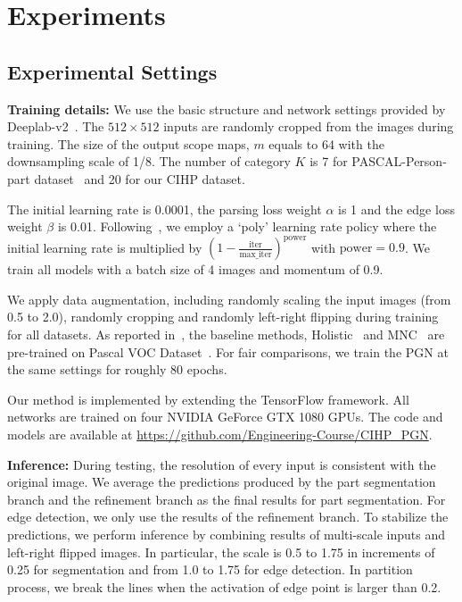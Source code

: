\documentclass[runningheads]{llncs}
\begin{document}
\section{Experiments}


\subsection{Experimental Settings}


\textbf{Training details:}
We use the basic structure and network settings provided by Deeplab-v2~\cite{chen2016deeplab}. The $512 \times 512$ inputs are randomly cropped from the images during training. The size of the output scope maps, $m$ equals to 64 with the downsampling scale of 1/8. The number of category $K$ is 7 for PASCAL-Person-part dataset~\cite{chen2014detect} and 20 for our CIHP dataset.


The initial learning rate is 0.0001, the parsing loss weight $\alpha$ is 1 and the edge loss weight $\beta$ is 0.01. Following~\cite{chen2017rethinking}, we employ a `poly' learning rate policy where the initial learning rate is multiplied by 
$(1-\frac{ \text{iter} }{ \text{max\_iter}})^\text{power}$ with $\text{power} = 0.9$. We train all models with a batch size of 4 images and momentum of 0.9.

We apply data augmentation, including randomly scaling the input images (from 0.5 to 2.0), randomly cropping and randomly left-right flipping during training for all datasets. As reported in~\cite{li2017holistic}, the baseline methods, Holistic~\cite{li2017holistic} and MNC~\cite{Dai_2016_CVPR} are pre-trained on Pascal VOC Dataset~\cite{everingham2010pascal}. For fair comparisons, we train the PGN at the same settings for roughly 80 epochs.

Our method is implemented by extending the TensorFlow framework. All networks are trained on four NVIDIA GeForce GTX 1080 GPUs. The code and models are available at \url{https://github.com/Engineering-Course/CIHP_PGN}.

\textbf{Inference:}
During testing, the resolution of every input is consistent with the original image. We average the predictions produced by the part segmentation branch and the refinement branch as the final results for part segmentation. For edge detection, we only use the results of the refinement branch. To stabilize the predictions, we perform inference by combining results of multi-scale inputs and left-right flipped images. In particular, the scale is 0.5 to 1.75 in increments of 0.25 for segmentation and from 1.0 to 1.75 for edge detection. In partition process, we break the lines when the activation of edge point is larger than 0.2.
\end{document}
